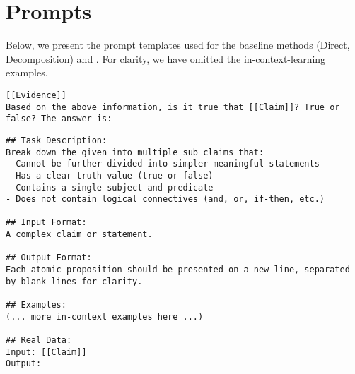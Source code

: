 \section{Prompts}\label{appendix:prompts}
Below, we present the prompt templates used for the baseline methods (Direct, Decomposition) and {\MyFC}. For clarity, we have omitted the in-context-learning examples.
\begin{lstlisting}[caption=Direct Prompt, label={lst:direct_prompt}]
[[Evidence]]
Based on the above information, is it true that [[Claim]]? True or false? The answer is: 
\end{lstlisting}
\begin{lstlisting}[caption=Decompostion Prompt, label={lst:decompostion_prompt}]
## Task Description:
Break down the given into multiple sub claims that:
- Cannot be further divided into simpler meaningful statements
- Has a clear truth value (true or false)
- Contains a single subject and predicate
- Does not contain logical connectives (and, or, if-then, etc.)

## Input Format:
A complex claim or statement.

## Output Format:
Each atomic proposition should be presented on a new line, separated by blank lines for clarity.

## Examples:
(... more in-context examples here ...)

## Real Data:
Input: [[Claim]]
Output:
\end{lstlisting}
